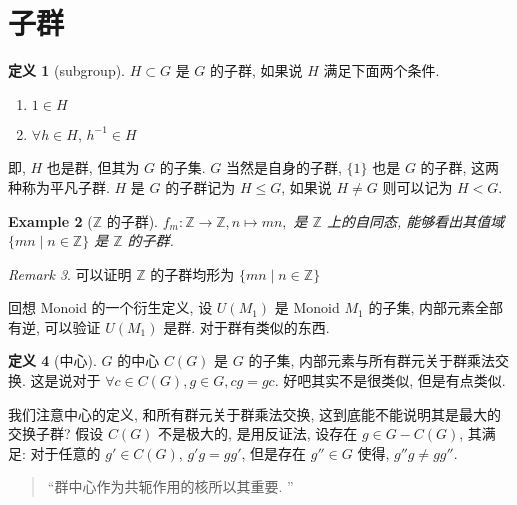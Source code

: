 \documentclass[12pt]{ctexart}
\theoremstyle{definition}
\theoremstyle{definition}
\newtheorem{definition}{定义}[section]
\theoremstyle{plain}
\newtheorem{exam}[definition]{Example}
\theoremstyle{remark}
\newtheorem{remark}[definition]{Remark}
\begin{document}
\section{子群}
\label{sec:子群}

\begin{definition}[subgroup]\label{def:subgroup}
\(H \subset G\) 是 \(G\) 的子群, 如果说 \(H\) 满足下面两个条件. 
\begin{enumerate}
\item  \(1\in H\)
\item  \(\forall h \in H\), \(h ^{-1} \in H\)
\end{enumerate}
	即, \(H\) 也是群, 但其为 \(G\) 的子集. \(G\) 当然是自身的子群, \(\{1\}\) 也是 \(G\) 的子群, 这两种称为平凡子群. \(H\) 是 \(G\) 的子群记为 \(H \le G\), 如果说 \(H \ne G\) 则可以记为 \(H < G\).
\end{definition}

\begin{exam}[\(\mathbb{Z}\) 的子群]
	\(f_{m} \colon \mathbb{Z} \to \mathbb{Z}, n \mapsto mn, \) 是 \(\mathbb{Z}\) 上的自同态, 能够看出其值域 \(\{ mn \mid n \in \mathbb{Z} \}\) 是 \(\mathbb{Z}\) 的子群. 
\end{exam}
\begin{remark}
	可以证明 \(\mathbb{Z}\) 的子群均形为 \(\{ mn \mid n \in \mathbb{Z} \}\)  
\end{remark}

回想 Monoid 的一个衍生定义, 设 \(U (M_{1})\) 是 Monoid \(M_{1}\) 的子集, 内部元素全部有逆, 可以验证 \(U (M_{1})\) 是群. 对于群有类似的东西. 
\begin{definition}[中心]\label{def:中心}
	\(G\) 的中心 \(C (G)\) 是 \(G\) 的子集, 内部元素与所有群元关于群乘法交换. 
	这是说对于 \(\forall c \in C (G) , g \in G, cg = g c\). 好吧其实不是很类似, 但是有点类似. 
\end{definition}

我们注意中心的定义, 和所有群元关于群乘法交换, 这到底能不能说明其是最大的交换子群? 
假设 \(C (G) \) 不是极大的, 是用反证法, 设存在 \(g\in G - C (G) \), 其满足: 对于任意的 \(g' \in C (G)\), \(g ' g = g g' \), 但是存在 \(g'' \in G\) 使得, \(g '' g \ne g g''\).

\begin{quote}
``群中心作为共轭作用的核所以其重要. ''
\end{quote}

\end{document}
